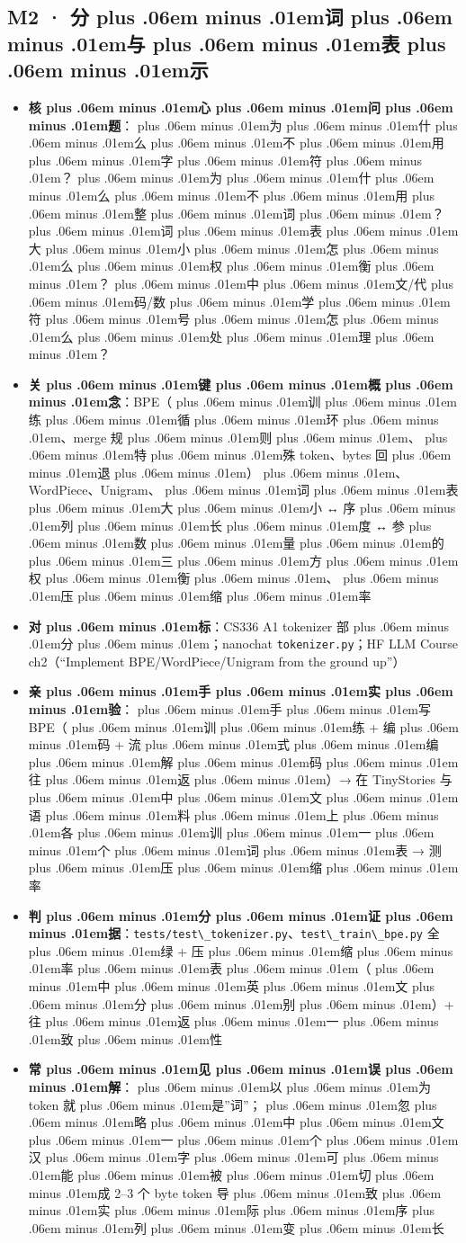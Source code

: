 \documentclass[
]{article}
\newcommand{\passthrough}[1]{#1}
\providecommand{\tightlist}{%
  \setlength{\itemsep}{0pt}\setlength{\parskip}{0pt}}
\def\zh#1{{\zhfont #1}}
\def\sym#1{{\symfont #1}}
\def\zhglue{\hskip0pt plus .06em minus .01em}
\begin{document}
\subsection{M2 \sym{·} \zh{分\zhglue 词\zhglue 与\zhglue 表\zhglue 示}}\label{m2-ux5206ux8bcdux4e0eux8868ux793a}

\begin{itemize}
\tightlist
\item
  \textbf{\zh{核\zhglue 心\zhglue 问\zhglue 题}}\zh{：\zhglue 为\zhglue 什\zhglue 么\zhglue 不\zhglue 用\zhglue 字\zhglue 符\zhglue ？\zhglue 为\zhglue 什\zhglue 么\zhglue 不\zhglue 用\zhglue 整\zhglue 词\zhglue ？\zhglue 词\zhglue 表\zhglue 大\zhglue 小\zhglue 怎\zhglue 么\zhglue 权\zhglue 衡\zhglue ？\zhglue 中\zhglue 文}/\zh{代\zhglue 码}/\zh{数\zhglue 学\zhglue 符\zhglue 号\zhglue 怎\zhglue 么\zhglue 处\zhglue 理\zhglue ？}
\item
  \textbf{\zh{关\zhglue 键\zhglue 概\zhglue 念}}\zh{：}BPE\zh{（\zhglue 训\zhglue 练\zhglue 循\zhglue 环\zhglue 、}merge \zh{规\zhglue 则\zhglue 、\zhglue 特\zhglue 殊} token\zh{、}bytes \zh{回\zhglue 退\zhglue ）\zhglue 、}WordPiece\zh{、}Unigram\zh{、\zhglue 词\zhglue 表\zhglue 大\zhglue 小} \sym{↔} \zh{序\zhglue 列\zhglue 长\zhglue 度} \sym{↔} \zh{参\zhglue 数\zhglue 量\zhglue 的\zhglue 三\zhglue 方\zhglue 权\zhglue 衡\zhglue 、\zhglue 压\zhglue 缩\zhglue 率}
\item
  \textbf{\zh{对\zhglue 标}}\zh{：}CS336 A1 tokenizer \zh{部\zhglue 分\zhglue ；}nanochat \passthrough{\lstinline!tokenizer.py!}\zh{；}HF LLM Course ch2\zh{（}``Implement BPE/WordPiece/Unigram from the ground up''\zh{）}
\item
  \textbf{\zh{亲\zhglue 手\zhglue 实\zhglue 验}}\zh{：\zhglue 手\zhglue 写} BPE\zh{（\zhglue 训\zhglue 练} + \zh{编\zhglue 码} + \zh{流\zhglue 式\zhglue 编\zhglue 解\zhglue 码\zhglue 往\zhglue 返\zhglue ）}\sym{→} \zh{在} TinyStories \zh{与\zhglue 中\zhglue 文\zhglue 语\zhglue 料\zhglue 上\zhglue 各\zhglue 训\zhglue 一\zhglue 个\zhglue 词\zhglue 表} \sym{→} \zh{测\zhglue 压\zhglue 缩\zhglue 率}
\item
  \textbf{\zh{判\zhglue 分\zhglue 证\zhglue 据}}\zh{：}\passthrough{\lstinline!tests/test\_tokenizer.py!}\zh{、}\passthrough{\lstinline!test\_train\_bpe.py!} \zh{全\zhglue 绿} + \zh{压\zhglue 缩\zhglue 率\zhglue 表\zhglue （\zhglue 中\zhglue 英\zhglue 文\zhglue 分\zhglue 别\zhglue ）}+ \zh{往\zhglue 返\zhglue 一\zhglue 致\zhglue 性}
\item
  \textbf{\zh{常\zhglue 见\zhglue 误\zhglue 解}}\zh{：\zhglue 以\zhglue 为} token \zh{就\zhglue 是}''\zh{词}''\zh{；\zhglue 忽\zhglue 略\zhglue 中\zhglue 文\zhglue 一\zhglue 个\zhglue 汉\zhglue 字\zhglue 可\zhglue 能\zhglue 被\zhglue 切\zhglue 成} 2--3 \zh{个} byte token \zh{导\zhglue 致\zhglue 实\zhglue 际\zhglue 序\zhglue 列\zhglue 变\zhglue 长}
\end{itemize}
\end{document}

